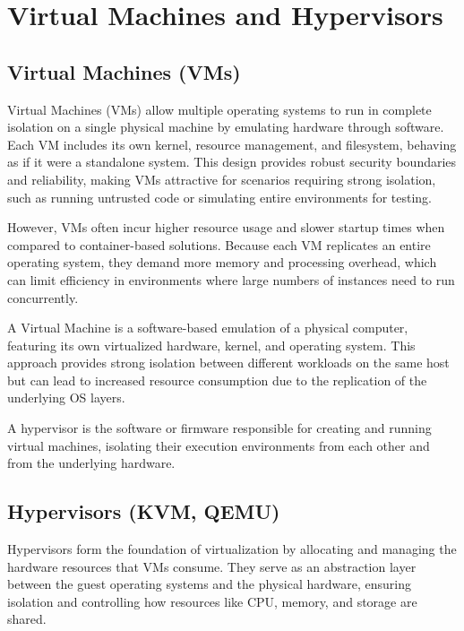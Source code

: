 \section{Virtual Machines and Hypervisors}

\subsection{Virtual Machines (VMs)}

Virtual Machines (VMs) allow multiple operating systems to run in complete isolation on a single physical machine by emulating hardware through software. Each VM includes its own kernel, resource management, and filesystem, behaving as if it were a standalone system. This design provides robust security boundaries and reliability, making VMs attractive for scenarios requiring strong isolation, such as running untrusted code or simulating entire environments for testing.

However, VMs often incur higher resource usage and slower startup times when compared to container-based solutions. Because each VM replicates an entire operating system, they demand more memory and processing overhead, which can limit efficiency in environments where large numbers of instances need to run concurrently.

\begin{definitionblock}
A Virtual Machine is a software-based emulation of a physical computer, featuring its own virtualized hardware, kernel, and operating system. This approach provides strong isolation between different workloads on the same host but can lead to increased resource consumption due to the replication of the underlying OS layers.
\end{definitionblock}

\begin{definitionblock}[Hypervisor]
A hypervisor is the software or firmware responsible for creating and running virtual machines, isolating their execution environments from each other and from the underlying hardware.
\end{definitionblock}

\subsection{Hypervisors (KVM, QEMU)}

Hypervisors form the foundation of virtualization by allocating and managing the hardware resources that VMs consume. They serve as an abstraction layer between the guest operating systems and the physical hardware, ensuring isolation and controlling how resources like CPU, memory, and storage are shared.

